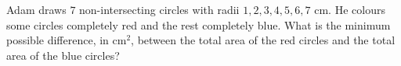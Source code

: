 Adam draws $7$ non-intersecting circles with radii $1,2,3,4,5,6,7$ cm. He colours some circles completely red and the rest completely blue. What is the minimum possible difference, in cm$^2$, between the total area of the red circles and the total area of the blue circles?
